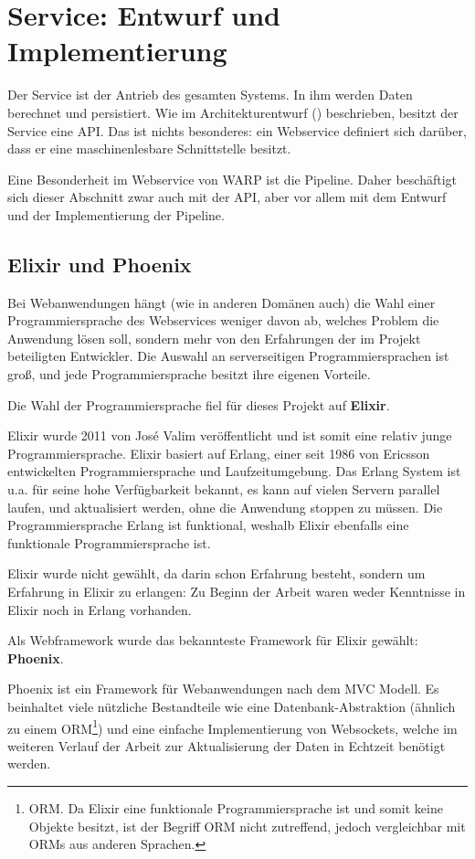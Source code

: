 \section{Service: Entwurf und Implementierung}
\label{sec:service}

Der Service ist der Antrieb des gesamten Systems. In ihm werden Daten berechnet und persistiert. Wie im Architekturentwurf () beschrieben, besitzt der Service eine \ac{API}. Das ist nichts besonderes: ein Webservice definiert sich darüber, dass er eine maschinenlesbare Schnittstelle besitzt.

Eine Besonderheit im Webservice von WARP ist die Pipeline. Daher beschäftigt sich dieser Abschnitt zwar auch mit der \ac{API}, aber vor allem mit dem Entwurf und der Implementierung der Pipeline.

\subsection{Elixir und Phoenix}

Bei Webanwendungen hängt (wie in anderen Domänen auch) die Wahl einer Programmiersprache des Webservices weniger davon ab, welches Problem die Anwendung lösen soll, sondern mehr von den Erfahrungen der im Projekt beteiligten Entwickler. Die Auswahl an serverseitigen Programmiersprachen ist groß, und jede Programmiersprache besitzt ihre eigenen Vorteile.

Die Wahl der Programmiersprache fiel für dieses Projekt auf \textbf{Elixir}.

Elixir wurde 2011 von José Valim veröffentlicht und ist somit eine relativ junge Programmiersprache. Elixir basiert auf Erlang, einer seit 1986 von Ericsson entwickelten Programmiersprache und Laufzeitumgebung. Das Erlang System ist u.a. für seine hohe Verfügbarkeit bekannt, es kann auf vielen Servern parallel laufen, und aktualisiert werden, ohne die Anwendung stoppen zu müssen. Die Programmiersprache Erlang ist funktional, weshalb Elixir ebenfalls eine funktionale Programmiersprache ist. \citep{wiki:elixir}

Elixir wurde nicht gewählt, da darin schon Erfahrung besteht, sondern um Erfahrung in Elixir zu erlangen: Zu Beginn der Arbeit waren weder Kenntnisse in Elixir noch in Erlang vorhanden.

Als Webframework wurde das bekannteste Framework für Elixir gewählt: \textbf{Phoenix}.

Phoenix ist ein Framework für Webanwendungen nach dem \ac{MVC} Modell. Es beinhaltet viele nützliche Bestandteile wie eine Datenbank-Abstraktion (ähnlich zu einem \acs{ORM}\footnote{\acf{ORM}. Da Elixir eine funktionale Programmiersprache ist und somit keine Objekte besitzt, ist der Begriff \acs{ORM} nicht zutreffend, jedoch vergleichbar mit ORMs aus anderen Sprachen.}) und eine einfache Implementierung von Websockets, welche im weiteren Verlauf der Arbeit zur Aktualisierung der Daten in Echtzeit benötigt werden.

